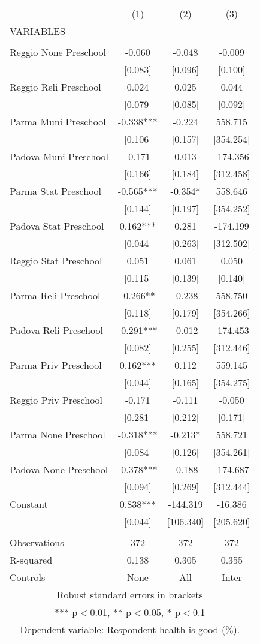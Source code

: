 \begin{tabular}{lccc} \hline
 & (1) & (2) & (3) \\
VARIABLES &  &  &  \\ \hline
 &  &  &  \\
Reggio None Preschool & -0.060 & -0.048 & -0.009 \\
 & [0.083] & [0.096] & [0.100] \\
Reggio Reli Preschool & 0.024 & 0.025 & 0.044 \\
 & [0.079] & [0.085] & [0.092] \\
Parma Muni Preschool & -0.338*** & -0.224 & 558.715 \\
 & [0.106] & [0.157] & [354.254] \\
Padova Muni Preschool & -0.171 & 0.013 & -174.356 \\
 & [0.166] & [0.184] & [312.458] \\
Parma Stat Preschool & -0.565*** & -0.354* & 558.646 \\
 & [0.144] & [0.197] & [354.252] \\
Padova Stat Preschool & 0.162*** & 0.281 & -174.199 \\
 & [0.044] & [0.263] & [312.502] \\
Reggio Stat Preschool & 0.051 & 0.061 & 0.050 \\
 & [0.115] & [0.139] & [0.140] \\
Parma Reli Preschool & -0.266** & -0.238 & 558.750 \\
 & [0.118] & [0.179] & [354.266] \\
Padova Reli Preschool & -0.291*** & -0.012 & -174.453 \\
 & [0.082] & [0.255] & [312.446] \\
Parma Priv Preschool & 0.162*** & 0.112 & 559.145 \\
 & [0.044] & [0.165] & [354.275] \\
Reggio Priv Preschool & -0.171 & -0.111 & -0.050 \\
 & [0.281] & [0.212] & [0.171] \\
Parma None Preschool & -0.318*** & -0.213* & 558.721 \\
 & [0.084] & [0.126] & [354.261] \\
Padova None Preschool & -0.378*** & -0.188 & -174.687 \\
 & [0.094] & [0.269] & [312.444] \\
Constant & 0.838*** & -144.319 & -16.386 \\
 & [0.044] & [106.340] & [205.620] \\
 &  &  &  \\
Observations & 372 & 372 & 372 \\
R-squared & 0.138 & 0.305 & 0.355 \\
 Controls & None & All & Inter \\ \hline
\multicolumn{4}{c}{ Robust standard errors in brackets} \\
\multicolumn{4}{c}{ *** p$<$0.01, ** p$<$0.05, * p$<$0.1} \\
\multicolumn{4}{c}{ Dependent variable: Respondent health is good (\%).} \\
\end{tabular}
